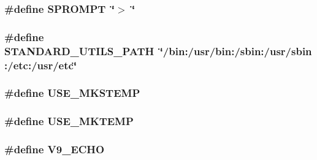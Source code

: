 \subsubsection[{\texorpdfstring{S\+P\+R\+O\+M\+PT}{SPROMPT}}]{\setlength{\rightskip}{0pt plus 5cm}\#define S\+P\+R\+O\+M\+PT~\char`\"{}$>$ \char`\"{}}\hypertarget{config-top_8h_a06580247d1207158b6351b7637e6cb80}{}\label{config-top_8h_a06580247d1207158b6351b7637e6cb80}
\subsubsection[{\texorpdfstring{S\+T\+A\+N\+D\+A\+R\+D\+\_\+\+U\+T\+I\+L\+S\+\_\+\+P\+A\+TH}{STANDARD_UTILS_PATH}}]{\setlength{\rightskip}{0pt plus 5cm}\#define S\+T\+A\+N\+D\+A\+R\+D\+\_\+\+U\+T\+I\+L\+S\+\_\+\+P\+A\+TH~\char`\"{}/bin\+:/usr/bin\+:/sbin\+:/usr/sbin\+:/etc\+:/usr/etc\char`\"{}}\hypertarget{config-top_8h_a6bb8777fb623e7aa3a29a32bf5acff76}{}\label{config-top_8h_a6bb8777fb623e7aa3a29a32bf5acff76}
\subsubsection[{\texorpdfstring{U\+S\+E\+\_\+\+M\+K\+S\+T\+E\+MP}{USE_MKSTEMP}}]{\setlength{\rightskip}{0pt plus 5cm}\#define U\+S\+E\+\_\+\+M\+K\+S\+T\+E\+MP}\hypertarget{config-top_8h_a4e70124cb31024337915114c87bf16a6}{}\label{config-top_8h_a4e70124cb31024337915114c87bf16a6}
\subsubsection[{\texorpdfstring{U\+S\+E\+\_\+\+M\+K\+T\+E\+MP}{USE_MKTEMP}}]{\setlength{\rightskip}{0pt plus 5cm}\#define U\+S\+E\+\_\+\+M\+K\+T\+E\+MP}\hypertarget{config-top_8h_a0b3e8c86db82daecd0ca180443da5605}{}\label{config-top_8h_a0b3e8c86db82daecd0ca180443da5605}
\subsubsection[{\texorpdfstring{V9\+\_\+\+E\+C\+HO}{V9_ECHO}}]{\setlength{\rightskip}{0pt plus 5cm}\#define V9\+\_\+\+E\+C\+HO}\hypertarget{config-top_8h_a7fbe321ade03be4d141ba882afd2798a}{}\label{config-top_8h_a7fbe321ade03be4d141ba882afd2798a}
